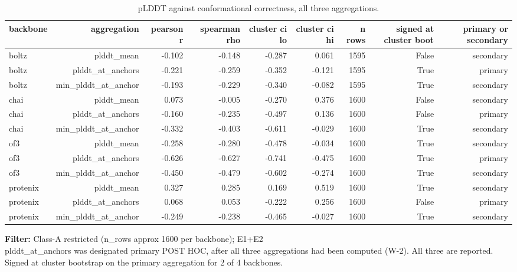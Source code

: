 \begin{table}[htbp]
\centering
\footnotesize
\caption{pLDDT against conformational correctness, all three aggregations.}
\label{tab:t4_confidence}
\begin{tabular}{lrrrrrrrr}
\toprule
backbone & aggregation & pearson r & spearman rho & cluster ci lo & cluster ci hi & n rows & signed at cluster boot & primary or secondary \\
\midrule
boltz & plddt\_mean & -0.102 & -0.148 & -0.287 & 0.061 & 1595 & False & secondary \\
boltz & plddt\_at\_anchors & -0.221 & -0.259 & -0.352 & -0.121 & 1595 & True & primary \\
boltz & min\_plddt\_at\_anchor & -0.193 & -0.229 & -0.340 & -0.082 & 1595 & True & secondary \\
chai & plddt\_mean & 0.073 & -0.005 & -0.270 & 0.376 & 1600 & False & secondary \\
chai & plddt\_at\_anchors & -0.160 & -0.235 & -0.497 & 0.136 & 1600 & False & primary \\
chai & min\_plddt\_at\_anchor & -0.332 & -0.403 & -0.611 & -0.029 & 1600 & True & secondary \\
of3 & plddt\_mean & -0.258 & -0.280 & -0.478 & -0.034 & 1600 & True & secondary \\
of3 & plddt\_at\_anchors & -0.626 & -0.627 & -0.741 & -0.475 & 1600 & True & primary \\
of3 & min\_plddt\_at\_anchor & -0.450 & -0.479 & -0.602 & -0.274 & 1600 & True & secondary \\
protenix & plddt\_mean & 0.327 & 0.285 & 0.169 & 0.519 & 1600 & True & secondary \\
protenix & plddt\_at\_anchors & 0.068 & 0.053 & -0.222 & 0.256 & 1600 & False & primary \\
protenix & min\_plddt\_at\_anchor & -0.249 & -0.238 & -0.465 & -0.027 & 1600 & True & secondary \\
\bottomrule
\end{tabular}
\begin{flushleft}\scriptsize
\textbf{Filter:} Class-A restricted (n\_rows approx 1600 per backbone); E1+E2
 \\ plddt\_at\_anchors was designated primary POST HOC, after all three aggregations had been computed (W-2). All three are reported. Signed at cluster bootstrap on the primary aggregation for 2 of 4 backbones.
\end{flushleft}
\end{table}
